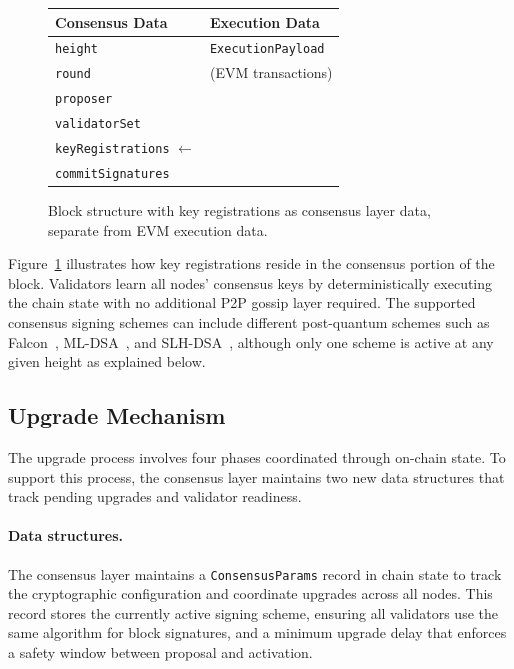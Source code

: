\begin{figure}[t]
\centering
\begin{tcolorbox}[colback=white, colframe=black, width=0.85\textwidth, boxrule=0.5pt]
\begin{tabular}{@{}p{}p{}@{}}
\textbf{Consensus Data} & \textbf{Execution Data} \\
\hline
\texttt{height} & \texttt{ExecutionPayload} \\
\texttt{round} & \quad (EVM transactions) \\
\texttt{proposer} & \\
\texttt{validatorSet} & \\
\texttt{keyRegistrations} $\leftarrow$ & \\
\texttt{commitSignatures} & \\
\end{tabular}
\end{tcolorbox}
\caption{Block structure with key registrations as consensus layer data, separate from EVM execution data.}
\label{fig:consensus-block-structure}
\end{figure}

Figure~\ref{fig:consensus-block-structure} illustrates how key registrations reside in the consensus portion of the block.
Validators learn all nodes' consensus keys by deterministically executing the chain state with no additional P2P gossip layer required.
The supported consensus signing schemes can include different post-quantum schemes such as Falcon~\cite{NISTPQC-R3:FALCON20}, ML-DSA~\cite{NIST:24MLDSA}, and SLH-DSA~\cite{NIST:24SLH}, although only one scheme is active at any given height as explained below.

\subsection{Upgrade Mechanism}\label{subsec:upgrade-mechanism}

The upgrade process involves four phases coordinated through on-chain state.
To support this process, the consensus layer maintains two new data structures that track pending upgrades and validator readiness.

\paragraph{Data structures.}\label{para:consensus-data-structures}
The consensus layer maintains a \texttt{ConsensusParams} record in chain state to track the cryptographic configuration and coordinate upgrades across all nodes.
This record stores the currently active signing scheme, ensuring all validators use the same algorithm for block signatures, and a minimum upgrade delay that enforces a safety window between proposal and activation.

